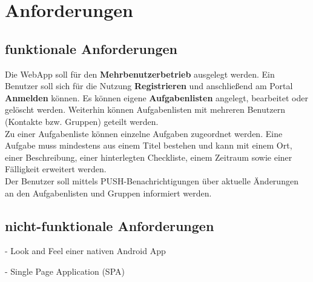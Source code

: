 \section{Anforderungen}

\subsection{funktionale Anforderungen}

Die WebApp soll für den \textbf{Mehrbenutzerbetrieb} ausgelegt werden. Ein Benutzer soll sich für die Nutzung \textbf{Registrieren} und anschließend am Portal \textbf{Anmelden} können. Es können eigene \textbf{Aufgabenlisten} angelegt, bearbeitet oder gelöscht werden. Weiterhin können Aufgabenlisten mit mehreren Benutzern (Kontakte bzw. Gruppen) geteilt werden. \\

Zu einer Aufgabenliste können einzelne Aufgaben zugeordnet werden. Eine Aufgabe muss mindestens aus einem Titel bestehen und kann mit einem Ort, einer Beschreibung, einer hinterlegten Checkliste, einem Zeitraum sowie einer Fälligkeit erweitert werden. \\

Der Benutzer soll mittels PUSH-Benachrichtigungen über aktuelle Änderungen an den Aufgabenlisten und Gruppen informiert werden. 

\subsection{nicht-funktionale Anforderungen}

- Look and Feel einer nativen Android App

- Single Page Application (SPA)

